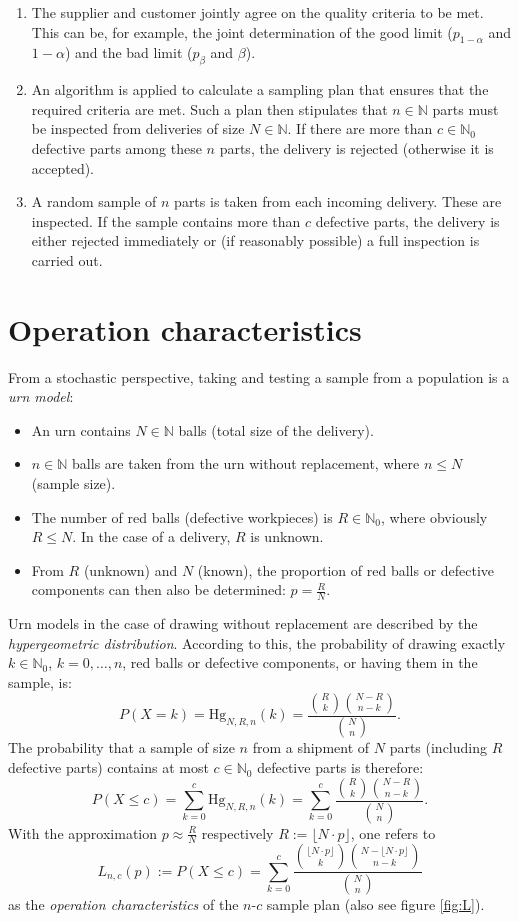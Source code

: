 \documentclass[a4paper,11pt,oneside]{article}
\begin{document}
\begin{enumerate}
\item
The supplier and customer jointly agree on the quality criteria to be met. This can be, for example, the joint determination of the good limit ($p_{1-\alpha}$ and $1-\alpha$) and the bad limit ($p_\beta$ and $\beta$).
\item
An algorithm is applied to calculate a sampling plan that ensures that the required criteria are met. Such a plan then stipulates that $n\in\mathbb N$ parts must be inspected from deliveries of size $N\in\mathbb N$. If there are more than $c\in\mathbb N_0$ defective parts among these $n$ parts, the delivery is rejected (otherwise it is accepted).
\item
A random sample of $n$ parts is taken from each incoming delivery. These are inspected. If the sample contains more than $c$ defective parts, the delivery is either rejected immediately or (if reasonably possible) a full inspection is carried out.
\end{enumerate}



\section{Operation characteristics}

From a stochastic perspective, taking and testing a sample from a population is a \emph{urn model}:

\begin{itemize}
\item
An urn contains $N\in\mathbb N$ balls (total size of the delivery).
\item
$n\in\mathbb N$ balls are taken from the urn without replacement, where $n\le N$ (sample size).
\item
The number of red balls (defective workpieces) is $R\in\mathbb N_0$, where obviously $R\le N$. In the case of a delivery, $R$ is unknown.
\item
From $R$ (unknown) and $N$ (known), the proportion of red balls or defective components can then also be determined: $p=\frac{R}{N}$.
\end{itemize}

Urn models in the case of drawing without replacement are described by the \emph{hypergeometric distribution}. According to this, the probability of drawing exactly $k\in\mathbb N_0$, $k=0,\ldots,n$, red balls or defective components, or having them in the sample, is:
$$
P(X=k)=
\mathrm{Hg}_{N,R,n}(k)=
\frac{\binom{R}{k}\binom{N-R}{n-k}}{\binom{N}{n}}.
$$
The probability that a sample of size $n$ from a shipment of $N$ parts (including $R$ defective parts) contains at most $c\in\mathbb N_0$ defective parts is therefore:
$$
P(X\le c)=
\sum_{k=0}^c \mathrm{Hg}_{N,R,n}(k)=
\sum_{k=0}^c \frac{\binom{R}{k}\binom{N-R}{n-k}}{\binom{N}{n}}.
$$
With the approximation $p\approx\frac{R}{N}$ respectively $R:=\lfloor N\cdot p\rfloor$, one refers to
$$
L_{n,c}(p):=
P(X\le c)=
\sum_{k=0}^c \frac{\binom{\lfloor N\cdot p\rfloor}{k}\binom{N-\lfloor N\cdot p\rfloor}{n-k}}{\binom{N}{n}}
$$
as the \emph{operation characteristics} of the $n$-$c$ sample plan (also see figure \ref{fig:L}).
\end{document}
